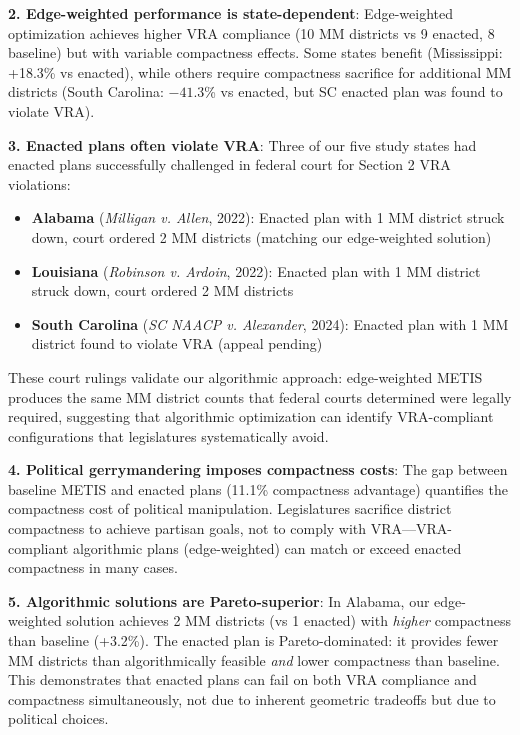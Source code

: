 \textbf{2. Edge-weighted performance is state-dependent}: Edge-weighted optimization achieves higher VRA compliance (10 MM districts vs 9 enacted, 8 baseline) but with variable compactness effects. Some states benefit (Mississippi: +18.3\% vs enacted), while others require compactness sacrifice for additional MM districts (South Carolina: $-41.3$\% vs enacted, but SC enacted plan was found to violate VRA).

\textbf{3. Enacted plans often violate VRA}: Three of our five study states had enacted plans successfully challenged in federal court for Section 2 VRA violations:
\begin{itemize}
    \item \textbf{Alabama} (\emph{Milligan v. Allen}, 2022): Enacted plan with 1 MM district struck down, court ordered 2 MM districts (matching our edge-weighted solution)
    \item \textbf{Louisiana} (\emph{Robinson v. Ardoin}, 2022): Enacted plan with 1 MM district struck down, court ordered 2 MM districts
    \item \textbf{South Carolina} (\emph{SC NAACP v. Alexander}, 2024): Enacted plan with 1 MM district found to violate VRA (appeal pending)
\end{itemize}

These court rulings validate our algorithmic approach: edge-weighted METIS produces the same MM district counts that federal courts determined were legally required, suggesting that algorithmic optimization can identify VRA-compliant configurations that legislatures systematically avoid.

\textbf{4. Political gerrymandering imposes compactness costs}: The gap between baseline METIS and enacted plans (11.1\% compactness advantage) quantifies the compactness cost of political manipulation. Legislatures sacrifice district compactness to achieve partisan goals, not to comply with VRA---VRA-compliant algorithmic plans (edge-weighted) can match or exceed enacted compactness in many cases.

\textbf{5. Algorithmic solutions are Pareto-superior}: In Alabama, our edge-weighted solution achieves 2 MM districts (vs 1 enacted) with \emph{higher} compactness than baseline (+3.2\%). The enacted plan is Pareto-dominated: it provides fewer MM districts than algorithmically feasible \emph{and} lower compactness than baseline. This demonstrates that enacted plans can fail on both VRA compliance and compactness simultaneously, not due to inherent geometric tradeoffs but due to political choices.

